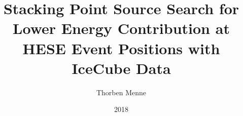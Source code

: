 

\author{Thorben Menne}
\title{Stacking Point Source Search for Lower Energy Contribution at HESE Event Positions with IceCube Data}
\date{2018}




\frontmatter
\maketitle
\tableofcontents

\mainmatter
% 





% 

\appendix
% 

\backmatter
% 

% 


